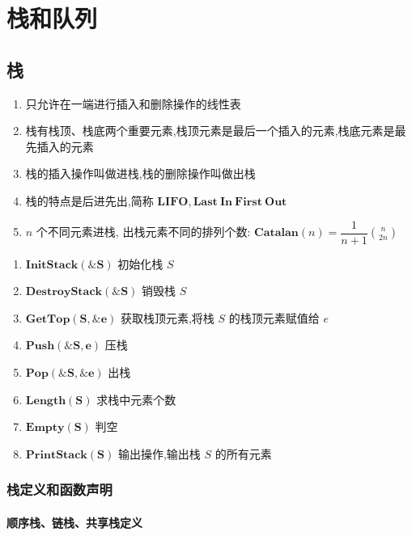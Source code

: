\chapter{栈和队列}
\section{栈}
\begin{definition}[栈]
    \begin{enumerate}
        \item 只允许在一端进行插入和删除操作的线性表
        \item 栈有栈顶、栈底两个重要元素,栈顶元素是最后一个插入的元素,栈底元素是最先插入的元素
        \item 栈的插入操作叫做进栈,栈的删除操作叫做出栈
        \item 栈的特点是后进先出,简称 $\mathbf{LIFO}, \mathbf{Last\ In\ First\ Out}$
        \item $n$ 个不同元素进栈, 出栈元素不同的排列个数: $\mathbf{Catalan}(n) = \dfrac{1}{n+1}\binom{n}{2n}$
    \end{enumerate}
\end{definition}

\begin{definition}[栈基本操作]
    \begin{enumerate}
        \item $\mathbf{InitStack(\& S)}$  初始化栈 $S$
        \item $\mathbf{DestroyStack(\& S)}$  销毁栈 $S$
        \item $\mathbf{GetTop(S,\&e)}$ 获取栈顶元素,将栈 $S$ 的栈顶元素赋值给 $e$
        \item $\mathbf{Push(\&S,e)}$ 压栈
        \item $\mathbf{Pop(\&S,\&e)}$ 出栈
        \item $\mathbf{Length(S)}$ 求栈中元素个数
        \item $\mathbf{Empty(S)}$ 判空
        \item $\mathbf{PrintStack(S)}$ 输出操作,输出栈 $S$ 的所有元素 
    \end{enumerate}
\end{definition}
\subsection{栈定义和函数声明}

\subsubsection{顺序栈、链栈、共享栈定义}


